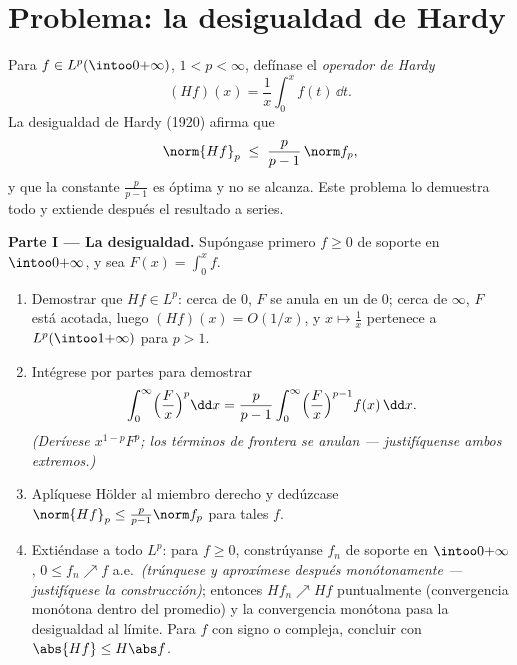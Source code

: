 \section{Problema: la desigualdad de Hardy}

\begin{problem}\label{pb:b3:lp:1} Para
$f \in L^p(\intoo0{+\infty})$, $1 < p < \infty$, defínase el
\emph{operador de Hardy}
\[
(Hf)(x) = \frac1x\int_0^x f(t)\,\dd t .
\]
La desigualdad de Hardy (1920) afirma que
\[
\norm{Hf}_p \;\leq\; \frac{p}{p-1}\,\norm f_p ,
\]
y que la constante $\frac p{p-1}$ es óptima y no se alcanza. Este
problema lo demuestra todo y extiende después el resultado a series.

\medskip
\noindent\textbf{Parte I --- La desigualdad.} Supóngase primero $f
\geq 0$  de soporte
 en $\intoo0{+\infty}$, y sea
$F(x) = \int_0^xf$.
\begin{enumerate}
  \item Demostrar que $Hf \in L^p$: cerca de $0$, $F$ se anula en un
   de $0$; cerca de $\infty$,
  $F$ está acotada, luego $(Hf)(x) = O(1/x)$, y $x \mapsto \frac1x$
  pertenece a $L^p(\intoo1{+\infty})$ para $p > 1$. \item Intégrese por
  partes para demostrar
        \[
        \int_0^\infty \Bigl(\frac Fx\Bigr)^p\dd x
        = \frac{p}{p-1}\int_0^\infty\Bigl(\frac
        Fx\Bigr)^{p-1}f(x)\,\dd x .
        \]
        \emph{(Derívese $x^{1-p}F^p$; los términos de frontera se anulan
        --- justifíquense ambos extremos.)} \item Aplíquese Hölder al
        miembro derecho y dedúzcase
        $\norm{Hf}_p \leq \frac p{p-1}\norm f_p$ para tales $f$. \item
        Extiéndase a todo $L^p$: para $f \geq 0$, constrúyanse $f_n$
         de soporte
         en
        $\intoo0{+\infty}$, $0 \leq f_n \nearrow f$ a.e.\
        \emph{(trúnquese y aproxímese después monótonamente ---
        justifíquese la construcción)}; entonces $Hf_n \nearrow Hf$
        puntualmente (convergencia monótona dentro del promedio) y la
        convergencia monótona pasa la desigualdad al límite. Para $f$
        con signo o compleja, concluir con $\abs{Hf} \leq H\abs f$.
\end{enumerate}


\end{problem}
